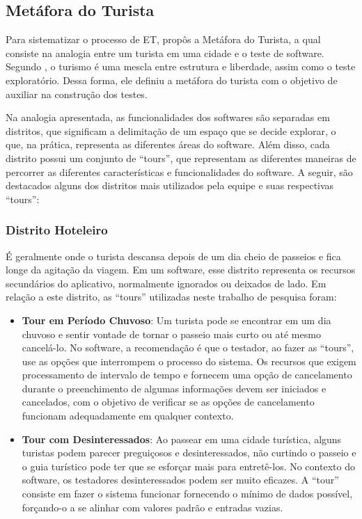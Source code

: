 \begin{table}[h]
{\begin{tabular}{|l|l|l|l|}
\end{tabular}%
}
\end{table}

\subsection{Metáfora do Turista}

Para sistematizar o processo de ET, \cite{whittaker2009exploratory} propôs a Metáfora do Turista, a qual consiste na analogia entre um turista em uma cidade e o teste de software. Segundo \cite{whittaker2009exploratory}, o turismo é uma mescla entre estrutura e liberdade, assim como o teste exploratório. Dessa forma, ele definiu a metáfora do turista com o objetivo de auxiliar na construção dos testes.

Na analogia apresentada, as funcionalidades dos softwares são separadas em distritos, que significam a delimitação de um espaço que se decide explorar, o que, na prática, representa as diferentes áreas do software. Além disso,  cada distrito possui um conjunto de ``tours'', que representam as diferentes maneiras de percorrer as diferentes características e funcionalidades do software. A seguir, são destacados alguns dos distritos mais utilizados pela equipe e suas respectivas ``tours'':

\subsubsection{Distrito Hoteleiro}

 É geralmente onde o turista descansa depois de um dia cheio de passeios e fica longe da agitação da viagem. Em um software, esse distrito representa os recursos secundários do aplicativo, normalmente ignorados ou deixados de lado. Em relação a este distrito, as ``tours'' utilizadas neste trabalho de pesquisa foram:

\begin{itemize}
    \item \textbf{Tour em Período Chuvoso}: Um turista pode se encontrar em um dia chuvoso e sentir vontade de tornar o passeio mais curto ou até mesmo cancelá-lo. No software, a recomendação é que o testador, ao fazer as ``tours'', use as opções que interrompem o processo do sistema. Os recursos que exigem processamento de intervalo de tempo e fornecem uma opção de cancelamento durante o preenchimento de algumas informações devem ser iniciados e cancelados, com o objetivo de verificar se as opções de cancelamento funcionam adequadamente em qualquer contexto.
    
    \item \textbf{Tour com Desinteressados}: Ao passear em uma cidade turística, alguns turistas podem parecer preguiçosos e desinteressados, não curtindo o passeio e o guia turístico pode ter que se esforçar mais para entretê-los. No contexto do software, os testadores desinteressados podem ser muito eficazes. A ``tour'' consiste em fazer o sistema funcionar fornecendo o mínimo de dados possível, forçando-o a se alinhar com valores padrão e entradas vazias.
\end{itemize}

